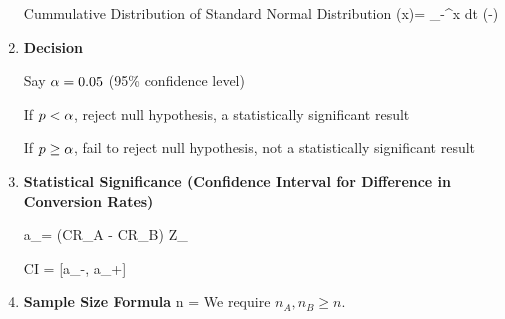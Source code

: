 \begin{enumerate}
Cummulative Distribution
of Standard Normal Distribution
\beq
\Phi (x)=
\int_{-\infty}^x dt\; \exp
\left(-\right)
\eeq

\item {\bf Decision}

Say $\alpha=0.05$ (95\% confidence level)

If $p< \alpha$, reject null hypothesis,
a statistically significant result

If $p \geq \alpha$, fail to reject null hypothesis, not a statistically significant result

\item {\bf Statistical Significance (Confidence Interval for Difference in Conversion Rates)} 

\beq
a_\pm = (CR_A - CR_B) \pm Z_{\alpha} \times {}
\eeq

\beq
CI = [a_-, a_+]
\eeq


\item {\bf Sample Size 
Formula}
\beq
n = 
\eeq
We require $n_A, n_B\geq n$.






\end{enumerate}
